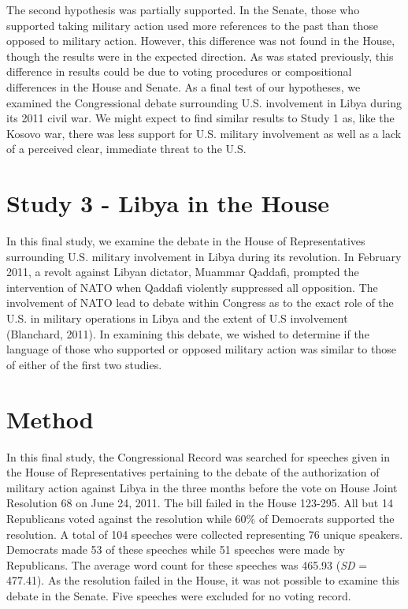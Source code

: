 \documentclass[english,,man]{apa6}
\theoremstyle{definition}
\theoremstyle{definition}
\theoremstyle{definition}
\theoremstyle{remark}
\begin{document}
The second hypothesis was partially supported. In the Senate, those who
supported taking military action used more references to the past than
those opposed to military action. However, this difference was not found
in the House, though the results were in the expected direction. As was
stated previously, this difference in results could be due to voting
procedures or compositional differences in the House and Senate. As a
final test of our hypotheses, we examined the Congressional debate
surrounding U.S. involvement in Libya during its 2011 civil war. We
might expect to find similar results to Study 1 as, like the Kosovo war,
there was less support for U.S. military involvement as well as a lack
of a perceived clear, immediate threat to the U.S.

\hypertarget{study-3---libya-in-the-house}{%
\section{Study 3 - Libya in the
House}\label{study-3---libya-in-the-house}}

In this final study, we examine the debate in the House of
Representatives surrounding U.S. military involvement in Libya during
its revolution. In February 2011, a revolt against Libyan dictator,
Muammar Qaddafi, prompted the intervention of NATO when Qaddafi
violently suppressed all opposition. The involvement of NATO lead to
debate within Congress as to the exact role of the U.S. in military
operations in Libya and the extent of U.S involvement (Blanchard, 2011).
In examining this debate, we wished to determine if the language of
those who supported or opposed military action was similar to those of
either of the first two studies.

\hypertarget{method-5}{%
\section{Method}\label{method-5}}

In this final study, the Congressional Record was searched for speeches
given in the House of Representatives pertaining to the debate of the
authorization of military action against Libya in the three months
before the vote on House Joint Resolution 68 on June 24, 2011. The bill
failed in the House 123-295. All but 14 Republicans voted against the
resolution while 60\% of Democrats supported the resolution. A total of
104 speeches were collected representing 76 unique speakers. Democrats
made 53 of these speeches while 51 speeches were made by Republicans.
The average word count for these speeches was 465.93 (\emph{SD} =
477.41). As the resolution failed in the House, it was not possible to
examine this debate in the Senate. Five speeches were excluded for no
voting record.
\end{document}
